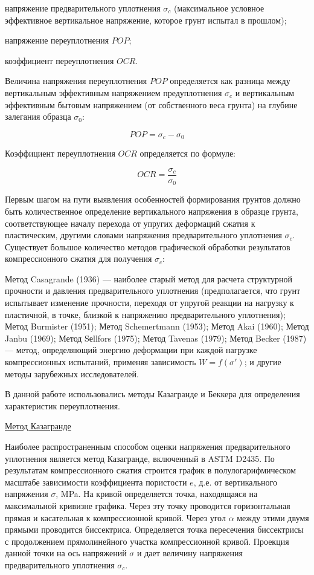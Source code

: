 напряжение предварительного уплотнения $\sigma_c$ 
(максимальное условное эффективное вертикальное напряжение, 
которое грунт испытал в прошлом);

напряжение переуплотнения $POP$;

коэффициент переуплотнения $OCR$.

Величина напряжения переуплотнения $POP$ определяется 
как разница между вертикальным эффективным напряжением 
предуплотнения $\sigma_c$ и вертикальным эффективным бытовым напряжением 
(от собственного веса грунта) на глубине залегания образца $\sigma_0$:

\[
   POP = \sigma_c - \sigma_0
\]

Коэффициент переуплотнения $OCR$ определяется по формуле:

\[
   OCR = \frac{\sigma_c}{\sigma_0}
\]

Первым шагом на пути выявления особенностей формирования грунтов должно быть количественное определение
вертикального напряжения в образце грунта, соответствующее началу перехода от упругих деформаций сжатия к пластическим,
другими словами напряжения предварительного уплотнения $\sigma_c$. 
Существует большое количество методов графической обработки 
результатов компрессионного сжатия для получения $\sigma_c$:

Метод Casagrande (1936) --- наиболее старый метод для расчета структурной 
прочности и давления предварительного уплотнения (предполагается, 
что грунт испытывает изменение прочности, переходя от упругой реакции на нагрузку 
к пластичной, в точке, близкой к напряжению предварительного уплотнения);
Метод Burmister (1951); Метод Schemertmann (1953); Метод Akai (1960);
Метод Janbu (1969); Метод Sеllfors (1975); Метод Tavenas (1979);
Метод Becker (1987) --- метод, определяющий энергию деформации
при каждой нагрузке компрессионных испытаний, применяя зависимость
\(W = f(\sigma')\); и другие методы зарубежных исследователей.
 
В данной работе использовались методы Казагранде и Беккера для определения характеристик 
переуплотнения.

\underline{Метод Казагранде}

Наиболее распространенным способом оценки напряжения предварительного 
уплотнения является метод Казагранде, включенный в ASTM D2435. 
По результатам компрессионного сжатия строится график в полулогарифмическом 
масштабе зависимости коэффициента пористости $e$, д.е. от 
вертикального напряжения $\sigma$, \si{\mega\pascal}. 
На кривой определяется точка, находящаяся на максимальной кривизне 
графика. Через эту точку проводится горизонтальная прямая 
и касательная к компрессионной кривой. 
Через угол $\alpha$ между этими двумя прямыми проводится биссектриса. 
Определяется точка пересечения биссектрисы с продолжением прямолинейного 
участка компрессионной кривой. Проекция данной точки на ось напряжений $\sigma$
и дает величину напряжения предварительного уплотнения $\sigma_c$.

